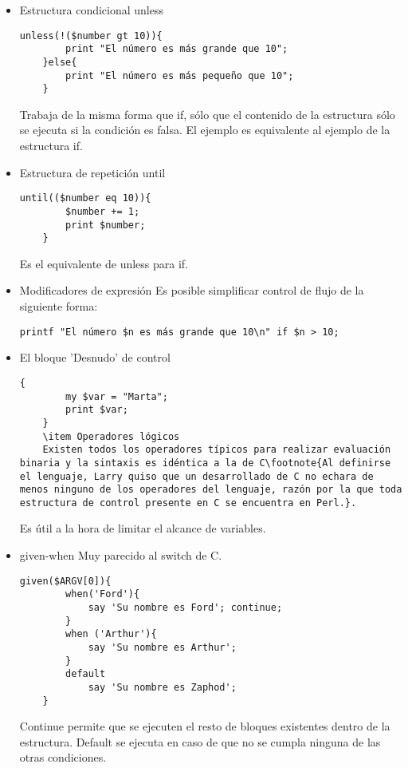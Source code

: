 \documentclass[12pt,a4paper]{memoir}
\begin{document}
\begin{itemize}
	\item Estructura condicional unless
	\lstset{language=Perl, showspaces=false}
	\begin{lstlisting}[frame=single, showspaces=false]
	unless(!($number gt 10)){
		print "El número es más grande que 10";
	}else{
		print "El número es más pequeño que 10";
	}
	\end{lstlisting}
	Trabaja de la misma forma que if, sólo que el contenido de la estructura sólo se ejecuta si la condición es falsa. El ejemplo es equivalente al ejemplo de la estructura if.
	\item	Estructura de repetición until
	\lstset{language=Perl, showspaces=false}
	\begin{lstlisting}[frame=single, showspaces=false]
	until(($number eq 10)){
		$number += 1;
		print $number;
	}
	\end{lstlisting}
	Es el equivalente de unless para if.
	\item Modificadores de expresión
	Es posible simplificar control de flujo de la siguiente forma:
	\lstset{language=Perl, showspaces=false}
	\begin{lstlisting}[frame=single, showspaces=false]
	printf "El número $n es más grande que 10\n" if $n > 10;
	\end{lstlisting}
	\item El bloque 'Desnudo' de control
	\lstset{language=Perl, showspaces=false}
	\begin{lstlisting}[frame=single, showspaces=false]
	{
		my $var = "Marta";
		print $var;
	}
	\item Operadores lógicos
	Existen todos los operadores típicos para realizar evaluación binaria y la sintaxis es idéntica a la de C\footnote{Al definirse el lenguaje, Larry quiso que un desarrollado de C no echara de menos ninguno de los operadores del lenguaje, razón por la que toda estructura de control presente en C se encuentra en Perl.}.
	\end{lstlisting}
	Es útil a la hora de limitar el alcance de variables.
	\item given-when
	Muy parecido al switch de C.
	\lstset{language=Perl, showspaces=false}
	\begin{lstlisting}[frame=single, showspaces=false]
	given($ARGV[0]){
		when('Ford'){
			say 'Su nombre es Ford'; continue;
		}
		when ('Arthur'){
			say 'Su nombre es Arthur';
		}
		default
			say 'Su nombre es Zaphod';
	}
	\end{lstlisting}
	Continue permite que se ejecuten el resto de bloques existentes dentro de la estructura. Default se ejecuta en caso de que no se cumpla ninguna de las otras condiciones.
	\end{itemize}
	
\end{document}
